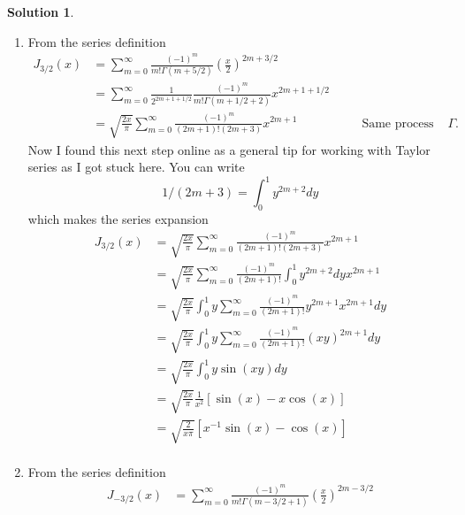 \documentclass[10pt]{article}
\theoremstyle{definition}
\newtheorem{soln}{Solution}
\newcommand{\justif}[2]{&{#1}&\text{#2}}
\begin{document}
\begin{soln}
\begin{enumerate}[label=(\alph*)]
\begin{align*}
                        & =\sqrt{\frac{2}{\pi x}} \cos x.
          \end{align*}
    \item From the series definition
          \begin{align*}
            J_{3/2}(x) & = \sum_{m=0}^\infty \frac{(-1)^m}{m!\Gamma(m+5/2)} {\left(\frac{x}{2}\right)}^{2m + 3/2}                                                  \\
                       & = \sum_{m=0}^\infty \frac{1}{2^{2m+1+1/2}}\frac{(-1)^m}{m!\Gamma(m+1/2+2)} x^{2m + 1+1/2}                                                 \\
                       & =\sqrt{\frac{2x}{\pi}}\sum_{m=0}^\infty \frac{(-1)^m}{(2m+1)!(2m+3)} x^{2m + 1}\justif{\quad}{Same process as previous to eval $\Gamma$.}
          \end{align*}
          Now I found this next step online as a general tip for working with Taylor series as I got stuck here. You can write
          $$1/(2m+3)=\int_{0}^{1}y^{2m+2}dy$$ which makes the series expansion
          \begin{align*}
            J_{3/2}(x) & = \sqrt{\frac{2x}{\pi}}\sum_{m=0}^\infty \frac{(-1)^m }{(2m+1)!(2m+3)} x^{2m + 1}                  \\
                       & = \sqrt{\frac{2x}{\pi}}\sum_{m=0}^\infty \frac{(-1)^m }{(2m+1)!} \int_{0}^{1}y^{2m+2}dy x^{2m + 1} \\
                       & = \sqrt{\frac{2x}{\pi}}\int_{0}^{1}y\sum_{m=0}^\infty \frac{(-1)^m }{(2m+1)!} y^{2m+1}x^{2m + 1}dy \\
                       & = \sqrt{\frac{2x}{\pi}}\int_{0}^{1}y\sum_{m=0}^\infty \frac{(-1)^m }{(2m+1)!} (xy)^{2m+1} dy       \\
                       & = \sqrt{\frac{2x}{\pi}}\int_{0}^{1}y\sin(xy) dy                                                    \\
                       & = \sqrt{\frac{2x}{\pi}}\frac{1}{x^2}\left[\sin(x)-x\cos(x)\right]                                  \\
                       & = \sqrt{\frac{2}{x\pi}}\left[x^{-1}\sin(x)-\cos(x)\right]                                          \\
          \end{align*}
    \item From the series definition
          \begin{align*}
            J_{-3/2}(x) & = \sum_{m=0}^\infty \frac{(-1)^m}{m!\Gamma(m-3/2+1)} {\left(\frac{x}{2}\right)}^{2m -3/2} \\

\end{align*}
\end{enumerate}
\end{soln}
\end{document}
